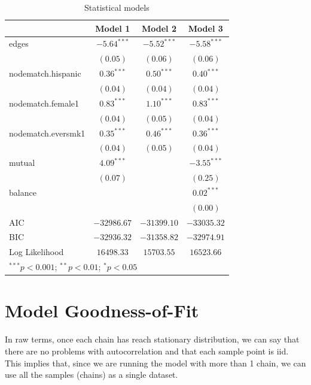 \documentclass[
]{book}
\begin{document}
\begin{table}
\begin{center}
\begin{tabular}{l c c c}
\hline
 & Model 1 & Model 2 & Model 3 \\
\hline
edges              & $-5.64^{***}$ & $-5.52^{***}$ & $-5.58^{***}$ \\
                   & $(0.05)$      & $(0.06)$      & $(0.06)$      \\
nodematch.hispanic & $0.36^{***}$  & $0.50^{***}$  & $0.40^{***}$  \\
                   & $(0.04)$      & $(0.04)$      & $(0.04)$      \\
nodematch.female1  & $0.83^{***}$  & $1.10^{***}$  & $0.83^{***}$  \\
                   & $(0.04)$      & $(0.05)$      & $(0.04)$      \\
nodematch.eversmk1 & $0.35^{***}$  & $0.46^{***}$  & $0.36^{***}$  \\
                   & $(0.04)$      & $(0.05)$      & $(0.04)$      \\
mutual             & $4.09^{***}$  &               & $-3.55^{***}$ \\
                   & $(0.07)$      &               & $(0.25)$      \\
balance            &               &               & $0.02^{***}$  \\
                   &               &               & $(0.00)$      \\
\hline
AIC                & $-32986.67$   & $-31399.10$   & $-33035.32$   \\
BIC                & $-32936.32$   & $-31358.82$   & $-32974.91$   \\
Log Likelihood     & $16498.33$    & $15703.55$    & $16523.66$    \\
\hline
\multicolumn{4}{l}{\scriptsize{$^{***}p<0.001$; $^{**}p<0.01$; $^{*}p<0.05$}}
\end{tabular}
\caption{Statistical models}
\label{table:coefficients}
\end{center}
\end{table}

\hypertarget{model-goodness-of-fit}{%
\section{Model Goodness-of-Fit}\label{model-goodness-of-fit}}

In raw terms, once each chain has reach stationary distribution, we can say that there are no problems with autocorrelation and that each sample point is iid. This implies that, since we are running the model with more than 1 chain, we can use all the samples (chains) as a single dataset.
\end{document}
